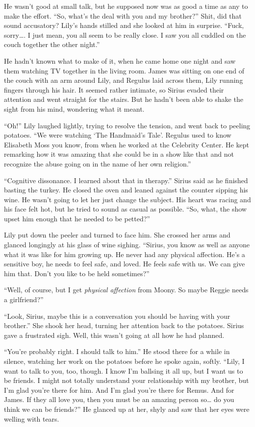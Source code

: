 \documentclass[12pt,twoside,openright]{memoir}
\begin{document}
He wasn't good at small talk, but he supposed now was as good a time as any to make the effort. ``So, what's the deal with you and my brother?'' Shit, did that sound accusatory? Lily's hands stilled and she looked at him in surprise.
``Fuck, sorry…. I just mean, you all seem to be really close. I saw you all cuddled on the couch together the other night.''

He hadn't known what to make of it, when he came home one night and saw them watching TV together in the living room. James was sitting on one end of the couch with an arm around Lily, and Regulus laid across them, Lily running fingers through his hair. It seemed rather intimate, so Sirius evaded their attention and went straight for the stairs. But he hadn't been able to shake the sight from his mind, wondering what it meant.

``Oh!'' Lily laughed lightly, trying to resolve the tension, and went back to peeling potatoes. ``We were watching ‘The Handmaid's Tale'. Regulus used to know Elisabeth Moss you know, from when he worked at the Celebrity Center. He kept remarking how it was amazing that she could be in a show like that and not recognize the abuse going on in the name of her own religion.'' 

``Cognitive dissonance. I learned about that in therapy.'' Sirius said as he finished basting the turkey. He closed the oven and leaned against the counter sipping his wine. He wasn't going to let her just change the subject. His heart was racing and his face felt hot, but he tried to sound as casual as possible. ``So, what, the show upset him enough that he needed to be petted?''

Lily put down the peeler and turned to face him. She crossed her arms and glanced longingly at his glass of wine sighing. ``Sirius, you know as well as anyone what it was like for him growing up. He never had any physical affection. He's a sensitive boy, he needs to feel safe, and loved. He feels safe with us. We can give him that. Don't you like to be held sometimes?''

``Well, of course, but I get \textit{physical affection} from Moony. So maybe Reggie needs a girlfriend?'' 

``Look, Sirius, maybe this is a conversation you should be having with your brother.'' She shook her head, turning her attention back to the potatoes. Sirius gave a frustrated sigh. Well, this wasn't going at all how he had planned. 

``You're probably right. I should talk to him.'' He stood there for a while in silence, watching her work on the potatoes before he spoke again, softly. ``Lily, I want to talk to you, too, though. I know I'm ballsing it all up, but I want us to be friends. I might not totally understand your relationship with my brother, but I'm glad you're there for him. And I'm glad you're there for Remus. And for James. If they all love you, then you must be an amazing person so… do you think we can be friends?'' He glanced up at her, shyly and saw that her eyes were welling with tears.
\end{document}
